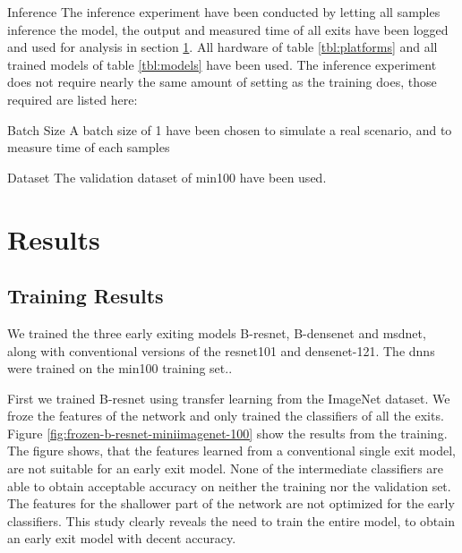 \begin{enumdescript}
	\item[Inference] The inference experiment have been conducted by letting all samples inference the model, the output and measured time of all exits have been logged and used for analysis in section \ref{sec:ee-results}. All hardware of table \ref{tbl:platforms} and all trained models of table \ref{tbl:models} have been used. The inference experiment does not require nearly the same amount of setting as the training does, those required are listed here:
	\begin{enumdescript}
		\item[Batch Size] A batch size of 1 have been chosen to simulate a real scenario, and to measure time of each samples
		\item[Dataset] The validation dataset of \gls{min100} have been used.
	\end{enumdescript} 
	
\end{enumdescript}

\section{Results} \label{sec:ee-results}

\subsection{Training Results}

We trained the three early exiting models B-\gls{resnet}, B-\gls{densenet} and \gls{msdnet}, along with conventional versions of the \gls{resnet}101 and \gls{densenet}-121. The \gls{dnn}s were trained on the \gls{min100} training set..

First we trained B-\gls{resnet} using transfer learning from the ImageNet dataset. We froze the features of the network and only trained the classifiers of all the exits. Figure \ref{fig:frozen-b-resnet-miniimagenet-100} show the results from the training. The figure shows, that the features learned from a conventional single exit model, are not suitable for an early exit model. None of the intermediate classifiers are able to obtain acceptable accuracy on neither the training nor the validation set. The features for the shallower part of the network are not optimized for the early classifiers. This study clearly reveals the need to train the entire model, to obtain an early exit model with decent accuracy.  

